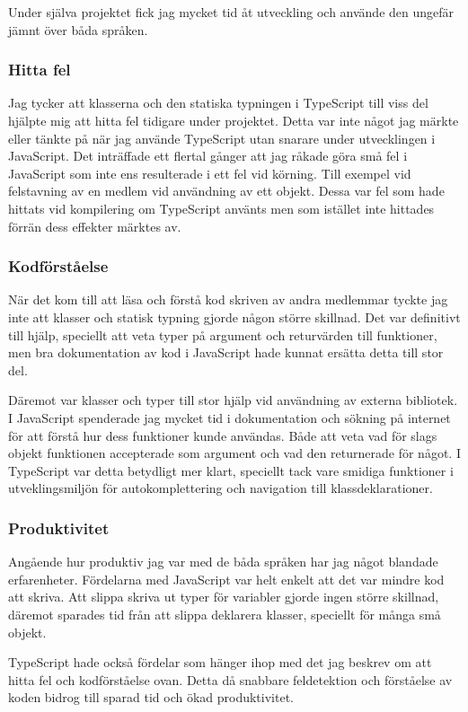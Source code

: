 Under själva projektet fick jag mycket tid åt utveckling och använde den ungefär jämnt över båda språken.
\subsubsection{Hitta fel}
Jag tycker att klasserna och den statiska typningen i TypeScript till viss del hjälpte mig att hitta fel tidigare under projektet. Detta var inte något jag märkte eller tänkte på när jag använde TypeScript utan snarare under utvecklingen i JavaScript. Det inträffade ett flertal gånger att jag råkade göra små fel i JavaScript som inte ens resulterade i ett fel vid körning. Till exempel vid felstavning av en medlem vid användning av ett objekt. Dessa var fel som hade hittats vid kompilering om TypeScript använts men som istället inte hittades förrän dess effekter märktes av.
\subsubsection{Kodförståelse}
När det kom till att läsa och förstå kod skriven av andra medlemmar tyckte jag inte att klasser och statisk typning gjorde någon större skillnad. Det var definitivt till hjälp, speciellt att veta typer på argument och returvärden till funktioner, men bra dokumentation av kod i JavaScript hade kunnat ersätta detta till stor del.

Däremot var klasser och typer till stor hjälp vid användning av externa bibliotek. I JavaScript spenderade jag mycket tid i dokumentation och sökning på internet för att förstå hur dess funktioner kunde användas. Både att veta vad för slags objekt funktionen accepterade som argument och vad den returnerade för något. I TypeScript var detta betydligt mer klart, speciellt tack vare smidiga funktioner i utveklingsmiljön för autokomplettering och navigation till klassdeklarationer.
\subsubsection{Produktivitet}
Angående hur produktiv jag var med de båda språken har jag något blandade erfarenheter. Fördelarna med JavaScript var helt enkelt att det var mindre kod att skriva. Att slippa skriva ut typer för variabler gjorde ingen större skillnad, däremot sparades tid från att slippa deklarera klasser, speciellt för många små objekt.

TypeScript hade också fördelar som hänger ihop med det jag beskrev om att hitta fel och kodförståelse ovan. Detta då snabbare feldetektion och förståelse av koden bidrog till sparad tid och ökad produktivitet.
